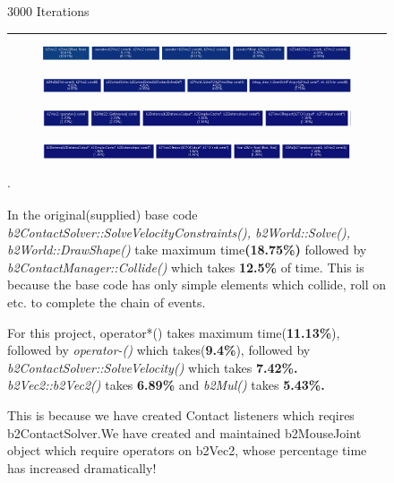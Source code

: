 \documentclass{report}
\begin{document}
\begin{figure}
\Large \begin{center}3000 Iterations \hrule \end{center}
\begin{subfigure}[h]{\textwidth}
\includegraphics[width=\textwidth, height=0.1\textwidth]{gprof/500_1.png}
\caption{}
\end{subfigure}
\begin{subfigure}[h]{\textwidth}
\includegraphics[width=\textwidth, height=0.1\textwidth]{gprof/500_2.png}
\caption{}
\end{subfigure}
\begin{subfigure}[h]{\textwidth}
\includegraphics[width=\textwidth, height=0.1\textwidth]{gprof/500_3.png}
\caption{}
\end{subfigure}
\begin{subfigure}[h]{\textwidth}
\includegraphics[width=\textwidth, height=0.1\textwidth]{gprof/500_4.png}
\caption{}
\end{subfigure}
\begin{list}{$\cdot$}{}
\item In the original(supplied) base code \emph{b2ContactSolver::SolveVelocityConstraints(), b2World::Solve(), b2World::DrawShape() } take maximum time\textbf{(18.75\%)} followed by \emph{b2ContactManager::Collide()} which takes \textbf{12.5\%} of time. This is because the base code has only simple elements which collide, roll on etc. to complete the chain of events.
\item For this project, operator*() takes maximum time(\textbf{11.13\%}), followed by \emph{operator-()} which takes(\textbf{9.4\%}), followed by \emph{b2ContactSolver::SolveVelocity()} which takes \textbf{7.42\%.} \emph{b2Vec2::b2Vec2()} takes \textbf{6.89\%} and \emph{b2Mul()} takes \textbf{5.43\%.}
\item This is because we have created Contact listeners which reqires b2ContactSolver.We have created and maintained b2MouseJoint object which require operators on b2Vec2, whose percentage time has increased dramatically! 
\item 
\end{list}
\end{figure}

\pagebreak




\end{document}
